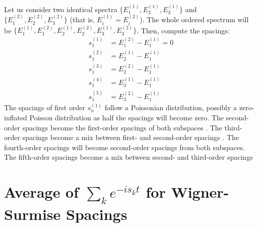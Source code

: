 \documentclass[10pt,a4paper]{article}
\begin{document}
Let us consider two identical spectra $\{E^{(1)}_1, E^{(1)}_2, E^{(1)}_3\}$
and $\{E^{(2)}_1, E^{(2)}_2, E^{(2)}_3\}$ (that is, $E^{(1)}_i = E^{(2)}_i$).
The whole ordered spectrum will be 
$\{E^{(1)}_1, E^{(2)}_1, E^{(1)}_2, E^{(2)}_2, E^{(1)}_3, E^{(2)}_3\}$.
Then, compute the spacings:
\begin{align}
s^{(1)}_1 &= E^{(2)}_1 - E^{(1)}_1 = 0\\
s^{(2)}_1 &= E^{(1)}_2 - E^{(1)}_1 \\
s^{(3)}_1 &= E^{(2)}_2 - E^{(1)}_1 \\
s^{(4)}_1 &= E^{(1)}_3 - E^{(1)}_1 \\
s^{(5)}_1 &= E^{(2)}_3 - E^{(1)}_1 
\end{align}
The spacings of first order $s_n^{(1)}$ follow a Poissonian distribution, 
possibly a zero-inflated Poisson distribution as half the spacings will 
become zero. The second-order spacings become the first-order spacings 
of both subspaces . The third-order spacings become a mix between first-
and second-order spacings . The fourth-order spacings will become second-order spacings from
both subspaces.
The fifth-order spacings become a mix between second- and third-order 
spacings



\appendix

\section{Average of $\sum_k e^{-i s_k t}$ for Wigner-Surmise Spacings}
\end{document}
